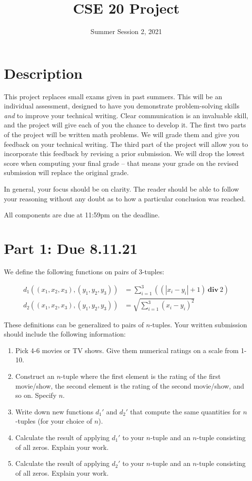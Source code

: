 \documentclass[12pt]{article}
\title{CSE 20 Project}
\date{Summer Session 2, 2021}
\author{}
\newcommand{\intdiv}[2]{\left( #1 \ \textbf{div} \ #2 \right)}
\begin{document}
\maketitle
\section*{Description}

This project replaces small exams given in past summers.
This will be an individual assessment, designed to have you demonstrate
problem-solving skills \emph{and} to improve your technical writing.
Clear communication is an invaluable skill, and the project will give each
of you the chance to develop it.
The first two parts of the project will be written math problems. We will grade
them and give you feedback on your technical writing.
The third part of the project will allow
you to incorporate this feedback by revising a prior submission.
We will drop the lowest score when computing your final grade -- that means
your grade on the revised submission will replace the original grade.

In general, your focus should be on clarity. The reader should be able to follow
your reasoning without any doubt as to how a particular conclusion was reached.

All components are due at 11:59pm on the deadline.


\section*{Part 1: Due 8.11.21}

We define the following functions on pairs of $3$-tuples:

\begin{align*}
  d_1((x_1, x_2, x_3), (y_1, y_2, y_3)) &= \sum_{i = 1}^3 \intdiv{\left( \left| x_i - y_i \right| + 1 \right)}{2} \\
  d_2((x_1, x_2, x_3), (y_1, y_2, y_3)) &= \sqrt{ \sum_{i = 1}^3 \left( x_i - y_i \right)^2 } 
\end{align*}

These definitions can be generalized to pairs of $n$-tuples.
Your written submission should include the following information: 

\begin{enumerate}
  \item Pick 4-6 movies or TV shows. Give them numerical ratings on a scale from
    1-10.
  \item Construct an $n$-tuple where the first element is the rating of the
    first movie/show, the second element is the rating of the second movie/show,
    and so on. Specify $n$.
  \item Write down new functions $d_1'$ and $d_2'$ that compute the same
    quantities for $n$-tuples (for your choice of $n$).
  \item Calculate the result of applying $d_1'$ to your $n$-tuple and an
    $n$-tuple consisting of all zeros. Explain your work.
  \item Calculate the result of applying $d_2'$ to your $n$-tuple and an
    $n$-tuple consisting of all zeros. Explain your work.
\end{enumerate}
\end{document}
